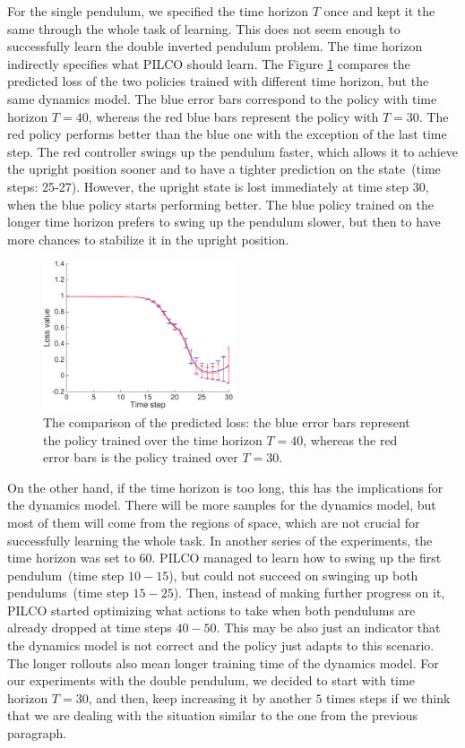 \noindent For the single pendulum, we specified the time horizon $T$ once and kept it the same through the whole task of learning. This does not seem enough to successfully learn the double inverted pendulum problem. The time horizon indirectly specifies what PILCO should learn. The Figure \ref{fig:exps:policytradeoff} compares the predicted loss of the two policies trained with different time horizon, but the same dynamics model. The blue error bars correspond to the policy with time horizon $T=40$, whereas the red blue bars represent the policy with $T=30$. The red policy performs better than the blue one with the exception of the last time step. The red controller swings up the pendulum faster, which allows it to achieve the upright position sooner and to have a tighter prediction on the state\ (time steps: 25-27). However, the upright state is lost immediately at time step 30, when the blue policy starts performing better. The blue policy trained on the longer time horizon prefers to swing up the pendulum slower, but then to have more chances to stabilize it in the upright position.

\begin{figure}[H]
\centering
\includegraphics[width=0.5\textwidth, scale=0.5]{plots/compare_pols}
\caption{\label{fig:exps:policytradeoff} The comparison of the predicted loss: the blue error bars represent the policy trained over the time horizon $T=40$, whereas the red error bars is the policy trained over $T=30$.}
\end{figure}

\noindent On the other hand, if the time horizon is too long, this has the implications for the dynamics model. There will be more samples for the dynamics model, but most of them will come from the regions of space, which are not crucial for successfully learning the whole task. In another series of the experiments, the time horizon was set to $60$. PILCO managed to learn how to swing up the first pendulum\ (time step $10-15$), but could not succeed on swinging up both pendulums\ (time step $15-25$). Then, instead of making further progress on it, PILCO started optimizing what actions to take when both pendulums are already dropped at time steps $40-50$. This may be also just an indicator that the dynamics model is not correct and the policy just adapts to this scenario. The longer rollouts also mean longer training time of the dynamics model. For our experiments with the double pendulum, we decided to start with time horizon $T=30$, and then, keep increasing it by another $5$ times steps if we think that we are dealing with the situation similar to the one from the previous paragraph.

